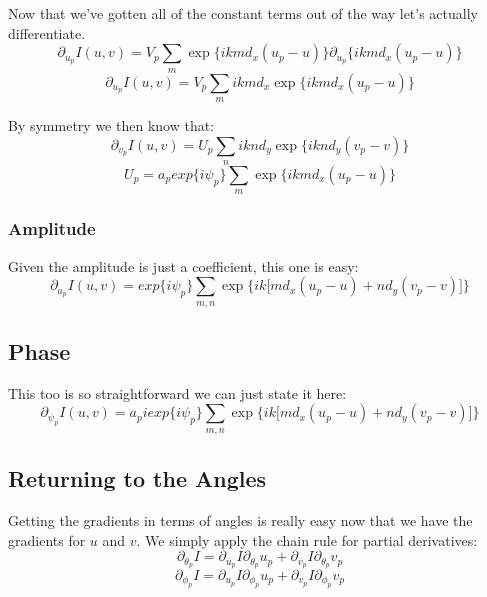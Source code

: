 \documentclass[10pt,a5paper]{book}
\begin{document}
Now that we've gotten all of the constant terms out of the way let's actually differentiate.
\begin{equation}
\partial_{u_p}I(u, v) =V_p\sum_{m}\exp\lbrace ikmd_x(u_p-u)\rbrace \partial_{u_p}\lbrace ikmd_x(u_p-u) \rbrace
\end{equation}
\begin{equation}
\partial_{u_p}I(u, v) =V_p\sum_{m}ikmd_x\exp\lbrace ikmd_x(u_p-u)\rbrace
\end{equation}

By symmetry we then know that:
\begin{equation}
\partial_{v_p}I(u, v) =U_p\sum_{n}iknd_y\exp\lbrace iknd_y(v_p-v)\rbrace
\end{equation}
\begin{equation}
U_p = a_p exp\lbrace i\psi_p \rbrace \sum_{m} \exp\lbrace ikmd_x(u_p-u)\rbrace
\end{equation}

\subsubsection{Amplitude}
Given the amplitude is just a coefficient, this one is easy:
\begin{equation}
\partial_{a_p}I(u, v) =  exp\lbrace i\psi_p \rbrace \sum_{m,n}\exp\lbrace ik \lbrack md_x(u_p-u)+nd_y(v_p-v)\rbrack\rbrace 
\end{equation}

\subsection{Phase}
This too is so straightforward we can just state it here:
\begin{equation}
\partial_{\psi_p}I(u, v) =  a_p iexp\lbrace i\psi_p \rbrace \sum_{m,n}\exp\lbrace ik \lbrack md_x(u_p-u)+nd_y(v_p-v)\rbrack\rbrace 
\end{equation}

\subsection{Returning to the Angles}
Getting the gradients in terms of angles is really easy now that we have the gradients for $u$ and $v$. We simply apply the chain rule for partial derivatives:
\begin{equation}
\partial_{\theta_p}I = \partial_{u_p}I \partial_{\theta_p}u_p + \partial_{v_p}I \partial_{\theta_p}v_p
\end{equation}
\begin{equation}
\partial_{\phi_p}I = \partial_{u_p}I \partial_{\phi_p}u_p + \partial_{v_p}I \partial_{\phi_p}v_p
\end{equation}
\end{document}
